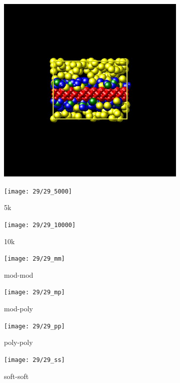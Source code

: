 \documentclass[a4paper]{article}
\begin{document}
\begin{figure}[H]
\begin{subfigure}{0.3\textwidth}
  \centering
  \includegraphics[width=\linewidth,keepaspectratio]{start}
  \caption{}
\end{subfigure}
\begin{subfigure}{0.3\textwidth}
  \centering
  \texttt{[image: 29/29\_5000]}
  \caption{5k}
\end{subfigure}
\begin{subfigure}{0.3\textwidth}
  \centering
  \texttt{[image: 29/29\_10000]}
  \caption{10k}
\end{subfigure}
\caption{}
\label{fig_1}
\end{figure}

\begin{figure}[H]
\begin{subfigure}{0.24\textwidth}
  \centering
  \texttt{[image: 29/29\_mm]}
  \caption{mod-mod}
\end{subfigure}
\begin{subfigure}{0.24\textwidth}
  \centering
  \texttt{[image: 29/29\_mp]}
  \caption{mod-poly}
\end{subfigure}
\begin{subfigure}{0.24\textwidth}
  \centering
  \texttt{[image: 29/29\_pp]}
  \caption{poly-poly}
\end{subfigure}
\begin{subfigure}{0.24\textwidth}
  \centering
  \texttt{[image: 29/29\_ss]}
  \caption{soft-soft}
\end{subfigure}
\caption{}
\label{fig_1}
\end{figure}
\end{document}
